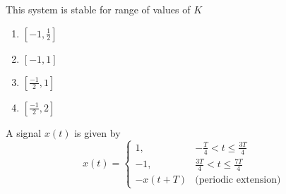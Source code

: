 This system is stable for range of values of $K$
\begin{multicols}{2}
\begin{enumerate}
    \item $[-1,\frac{1}{2}]$
    \item $[-1,1]$
    \item $[\frac{-1}{2},1]$
    \item $[\frac{-1}{2},2]$
\end{enumerate}
\end{multicols}
\item A signal \(x(t)\) is given by
\[
x(t) =
\begin{cases}
1, & -\frac{T}{4} < t \leq \frac{3T}{4} \\
-1, & \frac{3T}{4} < t \leq \frac{7T}{4} \\
-x(t + T) & \text{(periodic extension)}
\end{cases}
\]


